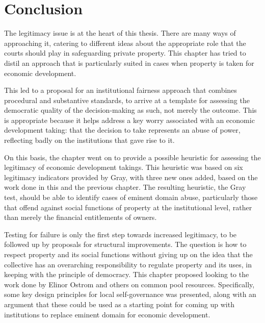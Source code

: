 \section{Conclusion}\label{sec:3:7}

The legitimacy issue is at the heart of this thesis. There are many ways of approaching it, catering to different ideas about the appropriate role that the courts should play in safeguarding private property. This chapter has tried to distil an approach that is particularly suited in cases when property is taken for economic development. 

This led to a proposal for an institutional fairness approach that combines procedural and substantive standards, to arrive at a template for assessing the democratic quality of the decision-making as such, not merely the outcome. This is appropriate because it helps address a key worry associated with an economic development taking: that the decision to take represents an abuse of power, reflecting badly on the institutions that gave rise to it.

On this basis, the chapter went on to provide a possible heuristic for assessing the legitimacy of economic development takings. This heuristic was based on six legitimacy indicators provided by Gray, with three new ones added, based on the work done in this and the previous chapter. The resulting heuristic, the Gray test, should be able to identify cases of eminent domain abuse, particularly those that offend against social functions of property at the institutional level, rather than merely the financial entitlements of owners.

Testing for failure is only the first step towards increased legitimacy, to be followed up by proposals for structural improvements. The question is how to respect property and its social functions without giving up on the idea that the collective has an overarching responsibility to regulate property and its uses, in keeping with the principle of democracy. This chapter proposed looking to the work done by Elinor Ostrom and others on common pool resources. Specifically, some key design principles for local self-governance was presented, along with an argument that these could be used as a starting point for coming up with institutions to replace eminent domain for economic development.

